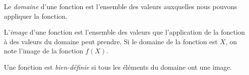\begin{definition}
    Le \emph{domaine} d'une fonction est l'ensemble des valeurs auxquelles nous pouvons appliquer la fonction.
\end{definition}

\begin{definition}
    L'\emph{image} d'une fonction est l'ensemble des valeurs que l'application de la fonction à des valeurs du domaine peut prendre. Si le domaine de la fonction est $X$, on note l'image de la fonction $f(X)$.
\end{definition}

\begin{definition}
    Une fonction est \emph{bien-définie} si tous les éléments du domaine ont une image.
\end{definition}